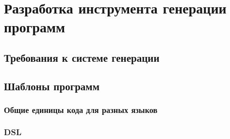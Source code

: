 \section{Разработка инструмента генерации программ}

\subsection{Требования к системе генерации}

\subsection{Шаблоны программ}
\subsubsection{Общие единицы кода для разных языков}
\subsubsection{DSL}


